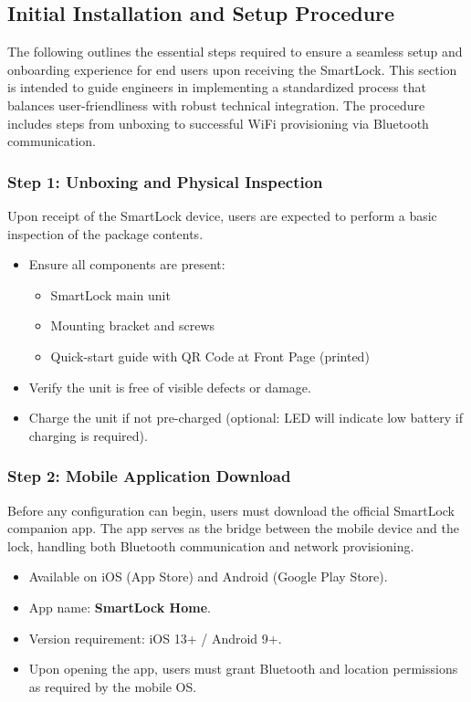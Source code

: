 \newpage
\subsection{Initial Installation and Setup Procedure}

The following outlines the essential steps required to ensure a seamless setup and onboarding experience for end users upon receiving the SmartLock. This section is intended to guide engineers in implementing a standardized process that balances user-friendliness with robust technical integration. The procedure includes steps from unboxing to successful WiFi provisioning via Bluetooth communication.

\subsubsection{Step 1: Unboxing and Physical Inspection}

Upon receipt of the SmartLock device, users are expected to perform a basic inspection of the package contents.

\begin{itemize}
    \item Ensure all components are present:
        \begin{itemize}
            \item SmartLock main unit
            \item Mounting bracket and screws
            \item Quick-start guide with QR Code at Front Page (printed)
        \end{itemize}
    \item Verify the unit is free of visible defects or damage.
    \item Charge the unit if not pre-charged (optional: LED will indicate low battery if charging is required).
\end{itemize}

\subsubsection{Step 2: Mobile Application Download}

Before any configuration can begin, users must download the official SmartLock companion app. The app serves as the bridge between the mobile device and the lock, handling both Bluetooth communication and network provisioning.

\begin{itemize}
    \item Available on iOS (App Store) and Android (Google Play Store).
    \item App name: \textbf{SmartLock Home}.
    \item Version requirement: iOS 13+ / Android 9+.
    \item Upon opening the app, users must grant Bluetooth and location permissions as required by the mobile OS.
\end{itemize}

